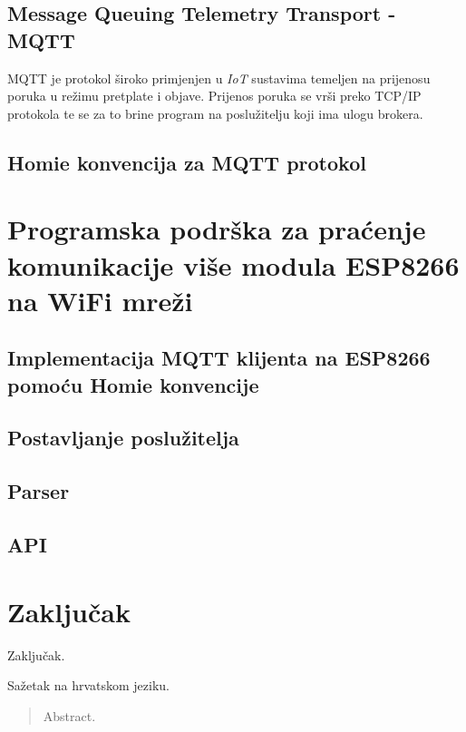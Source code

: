 \documentclass[times, utf8, zavrsni]{fer}
\begin{document}
\section{Message Queuing Telemetry Transport - \textbf{MQTT}}
MQTT je protokol široko primjenjen u \textit{IoT} sustavima temeljen na prijenosu poruka u režimu pretplate i objave.
Prijenos poruka se vrši preko TCP/IP protokola te se za to brine program na poslužitelju koji ima ulogu brokera.

\section{Homie konvencija za MQTT protokol}

\chapter{Programska podrška za praćenje komunikacije više modula ESP8266 na WiFi mreži}
\section{Implementacija MQTT klijenta na ESP8266 pomoću Homie konvencije}
\section{Postavljanje poslužitelja}
\section{Parser}
\section{API}

\chapter{Zaključak}
Zaključak.




\begin{sazetak}
Sažetak na hrvatskom jeziku.

\end{sazetak}

\begin{abstract}
Abstract.

\end{abstract}
\end{document}
